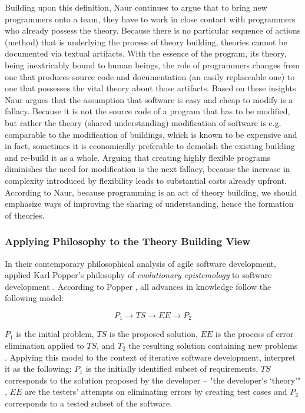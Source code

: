 Building upon this definition, Naur continues to argue that to bring new programmers onto a team, they have to work in close contact with programmers who already possess the theory.
Because there is no particular sequence of actions (method) that is underlying the process of theory building, theories cannot be documented via textual artifacts.
With the essence of the program, its theory, being inextricably bound to human beings, the role of programmers changes from one that produces source code and documentation (an easily replaceable one) to one that possesses the vital theory about those artifacts.
Based on these insights Naur argues that the assumption that software is easy and cheap to modify is a fallacy.
Because it is not the source code of a program that has to be modified, but rather the theory (shared understanding) modification of software is e.g. comparable to the modification of buildings, which is known to be expensive and in fact, sometimes it is economically preferable to demolish the existing building and re-build it as a whole.
Arguing that creating highly flexible programs diminishes the need for modification is the next fallacy, because the increase in complexity introduced by flexibility leads to substantial costs already upfront.
According to Naur, because programming is an act of theory building, we should emphasize ways of improving the sharing of understanding, hence the formation of theories.

\subsubsection{Applying Philosophy to the Theory Building View}

In their contemporary philosophical analysis of agile software development, \citeauthor{northover_agile_2007} applied Karl Popper's philosophy of \emph{evolutionary epistemology} to software development \cite{northover_agile_2007}.
According to Popper \cite{northover_karl_2006}, all advances in knowledge follow the following model:

\[P_1 \rightarrow TS \rightarrow EE \rightarrow P_2\]

$P_1$ is the initial problem, $TS$ is the proposed solution, $EE$ is the process of error elimination applied to $TS$, and $T_2$ the resulting solution containing new problems \cite{northover_karl_2006}.
Applying this model to the context of iterative software development, \citeauthor{northover_agile_2007} interpret it as the following: $P_1$ is the initially identified subset of requirements, $TS$ corresponds to the solution proposed by the developer -- "the developer's `theory'" \cite{northover_agile_2007}, $EE$ are the testers' attempts on eliminating errors by creating test cases and $P_2$ corresponds to a tested subset of the software.

